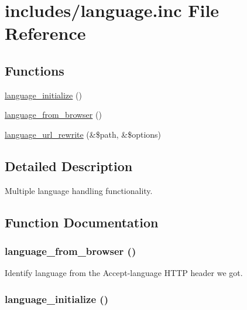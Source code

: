 \hypertarget{language_8inc}{
\section{includes/language.inc File Reference}
\label{language_8inc}
}
\subsection*{Functions}
\begin{CompactItemize}
\item 
\hyperlink{language_8inc_9eb2bf336ad0c6b931403698dc31ba4c}{language\_\-initialize} ()
\item 
\hyperlink{language_8inc_1e3f407fdf4dbabd723f5ff2c009511e}{language\_\-from\_\-browser} ()
\item 
\hyperlink{language_8inc_4b859d3f6ab4515f228094edcd6c78c8}{language\_\-url\_\-rewrite} (\&\$path, \&\$options)
\end{CompactItemize}


\subsection{Detailed Description}
Multiple language handling functionality. 

\subsection{Function Documentation}
\hypertarget{language_8inc_1e3f407fdf4dbabd723f5ff2c009511e}{
\subsubsection[{language\_\-from\_\-browser}]{\setlength{\rightskip}{0pt plus 5cm}language\_\-from\_\-browser ()}}
\label{language_8inc_1e3f407fdf4dbabd723f5ff2c009511e}


Identify language from the Accept-language HTTP header we got. \hypertarget{language_8inc_9eb2bf336ad0c6b931403698dc31ba4c}{
\subsubsection[{language\_\-initialize}]{\setlength{\rightskip}{0pt plus 5cm}language\_\-initialize ()}}
\label{language_8inc_9eb2bf336ad0c6b931403698dc31ba4c}


